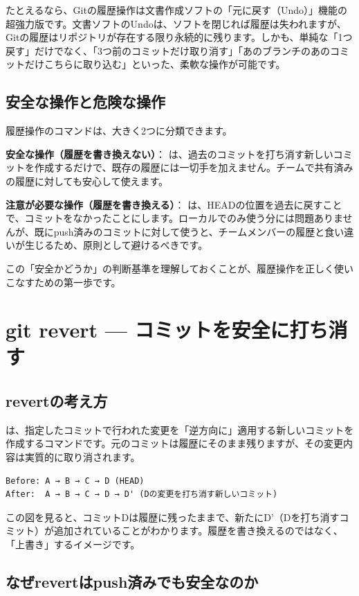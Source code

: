 たとえるなら、Gitの履歴操作は文書作成ソフトの「元に戻す（Undo）」機能の超強力版です。文書ソフトのUndoは、ソフトを閉じれば履歴は失われますが、Gitの履歴はリポジトリが存在する限り永続的に残ります。しかも、単純な「1つ戻す」だけでなく、「3つ前のコミットだけ取り消す」「あのブランチのあのコミットだけこちらに取り込む」といった、柔軟な操作が可能です。

\subsection{安全な操作と危険な操作}

履歴操作のコマンドは、大きく2つに分類できます。

\textbf{安全な操作（履歴を書き換えない）}： は、過去のコミットを打ち消す新しいコミットを作成するだけで、既存の履歴には一切手を加えません。チームで共有済みの履歴に対しても安心して使えます。

\textbf{注意が必要な操作（履歴を書き換える）}： は、HEADの位置を過去に戻すことで、コミットをなかったことにします。ローカルでのみ使う分には問題ありませんが、既にpush済みのコミットに対して使うと、チームメンバーの履歴と食い違いが生じるため、原則として避けるべきです。

この「安全かどうか」の判断基準を理解しておくことが、履歴操作を正しく使いこなすための第一歩です。

\section{git revert — コミットを安全に打ち消す}

\subsection{revertの考え方}

 は、指定したコミットで行われた変更を「逆方向に」適用する新しいコミットを作成するコマンドです。元のコミットは履歴にそのまま残りますが、その変更内容は実質的に取り消されます。

\begin{lstlisting}[language={}]
Before: A → B → C → D (HEAD)
After:  A → B → C → D → D' (Dの変更を打ち消す新しいコミット)
\end{lstlisting}

この図を見ると、コミットDは履歴に残ったままで、新たにD'（Dを打ち消すコミット）が追加されていることがわかります。履歴を書き換えるのではなく、「上書き」するイメージです。

\subsection{なぜrevertはpush済みでも安全なのか}

